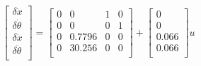 \documentclass[a4paper,12pt]{article}
\begin{document}
\begin{equation}\label{linearized}
    \begin{bmatrix}
        \delta \dot x\\
        \delta \dot \theta\\
        \delta \dot x\\
        \delta \ddot \theta\\
    \end{bmatrix}
    =
    \begin{bmatrix}
        0 & 0 & 1 & 0 \\
        0 & 0 & 0 & 1 \\
        0 & 0.7796 & 0 & 0\\
        0 & 30.256 & 0 & 0\\
    \end{bmatrix}
    +
    \begin{bmatrix}
        0\\
        0\\
        0.066\\
        0.066\\
    \end{bmatrix}
    u
\end{equation}
\end{document}
